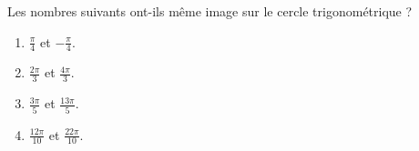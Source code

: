 
\begin{exercice}\label{exosmath-0362}

    Les nombres suivants ont-ils même image sur le cercle trigonométrique ?
    \begin{multicols}{2}
    \begin{enumerate}
        \item
            \( \frac{ \pi }{ 4 }\) et \( -\frac{ \pi }{ 4 }\).
        \item
            \( \frac{ 2\pi }{ 3 }\) et \( \frac{ 4\pi }{ 3 }\).
        \item
            \( \frac{ 3\pi }{ 5 }\) et \( \frac{ 13\pi }{ 5 }\).
        \item
            \( \frac{ 12\pi }{ 10 }\) et \( \frac{ 22\pi }{ 10 }\).
    \end{enumerate}
    \end{multicols}

\end{exercice}
